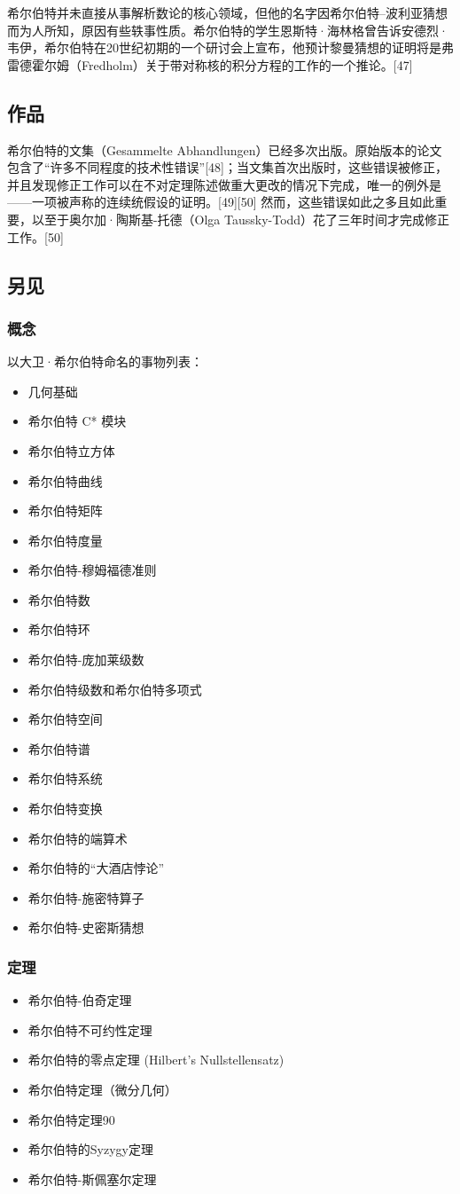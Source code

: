 希尔伯特并未直接从事解析数论的核心领域，但他的名字因希尔伯特–波利亚猜想而为人所知，原因有些轶事性质。希尔伯特的学生恩斯特·海林格曾告诉安德烈·韦伊，希尔伯特在20世纪初期的一个研讨会上宣布，他预计黎曼猜想的证明将是弗雷德霍尔姆（Fredholm）关于带对称核的积分方程的工作的一个推论。[47]
\subsection{作品}
希尔伯特的文集（Gesammelte Abhandlungen）已经多次出版。原始版本的论文包含了“许多不同程度的技术性错误”[48]；当文集首次出版时，这些错误被修正，并且发现修正工作可以在不对定理陈述做重大更改的情况下完成，唯一的例外是——一项被声称的连续统假设的证明。[49][50] 然而，这些错误如此之多且如此重要，以至于奥尔加·陶斯基-托德（Olga Taussky-Todd）花了三年时间才完成修正工作。[50]
\subsection{另见}
\subsubsection{概念}
以大卫·希尔伯特命名的事物列表：
\begin{itemize}
\item 几何基础
\item 希尔伯特 C* 模块
\item 希尔伯特立方体
\item 希尔伯特曲线
\item 希尔伯特矩阵
\item 希尔伯特度量
\item 希尔伯特-穆姆福德准则
\item 希尔伯特数
\item 希尔伯特环
\item 希尔伯特-庞加莱级数
\item 希尔伯特级数和希尔伯特多项式
\item 希尔伯特空间
\item 希尔伯特谱
\item 希尔伯特系统
\item 希尔伯特变换
\item 希尔伯特的端算术
\item 希尔伯特的“大酒店悖论”
\item 希尔伯特-施密特算子
\item 希尔伯特-史密斯猜想
\end{itemize}
\subsubsection{定理}
\begin{itemize}
\item 希尔伯特-伯奇定理
\item 希尔伯特不可约性定理
\item 希尔伯特的零点定理 (Hilbert's Nullstellensatz)
\item 希尔伯特定理（微分几何）
\item 希尔伯特定理90
\item 希尔伯特的Syzygy定理
\item 希尔伯特-斯佩塞尔定理
\end{itemize}
